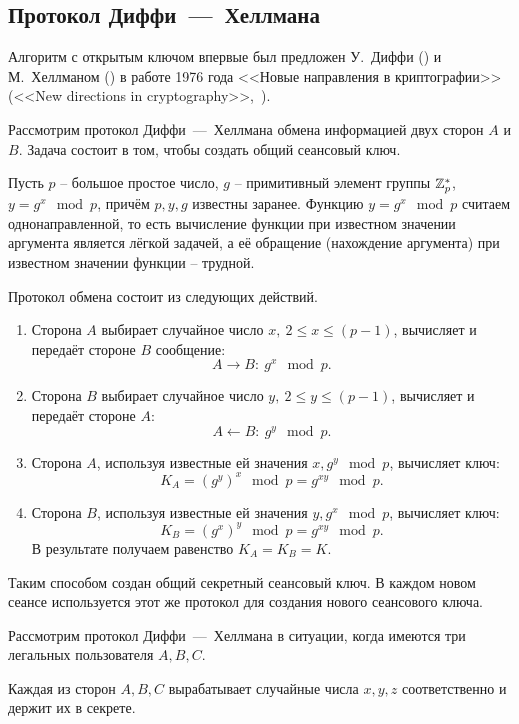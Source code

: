 \subsection{Протокол Диффи~---~Хеллмана}

Алгоритм с открытым ключом впервые был предложен У.~Диффи () и М.~Хеллманом () в работе 1976 года <<Новые направления в криптографии>> (<<New directions in cryptography>>,~\cite{Diffie:Hellman:1976}).

Рассмотрим протокол Диффи~---~Хеллмана обмена информацией двух сторон $A$ и $B$. Задача состоит в том, чтобы создать общий сеансовый ключ.

Пусть $p$ -- большое простое число, $g$ -- примитивный элемент группы $\mathbb{Z}_p^*$, ~ $y = g^x \mod p$, причём $p,y,g$ известны заранее. Функцию $y=g^{x} \mod p$ считаем однонаправленной, то есть вычисление функции при известном значении аргумента является лёгкой задачей, а её обращение (нахождение аргумента) при известном значении функции -- трудной.

Протокол обмена состоит из следующих действий.
\begin{enumerate}
    \item Сторона $A$ выбирает случайное число $x, ~ 2 \leq x \leq (p-1)$, вычисляет и передаёт стороне $B$ сообщение:
        \[ A \rightarrow B: ~ g^x \mod p. \]
    \item Сторона $B$ выбирает случайное число $y, ~ 2\leq y \leq (p-1)$, вычисляет и передаёт стороне $A$:
        \[ A \leftarrow B: ~ g^y \mod p. \]
    \item Сторона $A$, используя известные ей значения $x,g^{y} \mod p$, вычисляет ключ:
        \[ K_{A} =(g^{y})^{x}\mod p=g^{xy} \mod p. \]
    \item Сторона $B$, используя известные ей значения $y,g^{x} \mod p$, вычисляет ключ:
        \[ K_{B} =(g^{x})^{y}\mod p=g^{xy}\mod p. \]
        В результате получаем равенство $K_A = K_B = K$.
\end{enumerate}

Таким способом создан общий секретный сеансовый ключ. В каждом новом сеансе используется этот же протокол для создания нового сеансового ключа.

Рассмотрим протокол Диффи~---~Хеллмана в ситуации, когда имеются три легальных пользователя $A,B,C$.

Каждая из сторон $A,B,C$ вырабатывает случайные числа $x,y,z$ соответственно и держит их в секрете.

